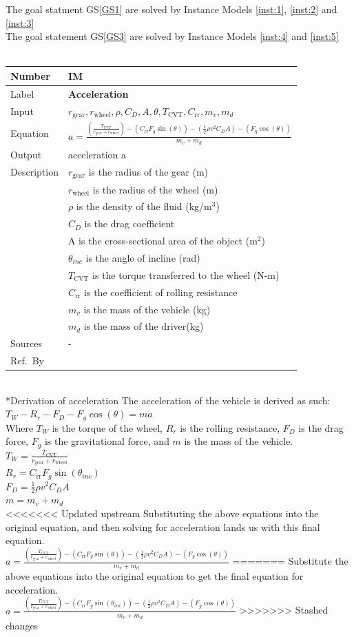 \documentclass[12pt]{article}
\newcommand{\colAwidth}{0.13\textwidth}
\newcommand{\colBwidth}{0.82\textwidth}
\newcounter{instnum} %
\newcommand{\definstance}[7] {
~\newline
\noindent
\begin{minipage}{\textwidth}
\renewcommand*{\arraystretch}{1.5}
\begin{tabular}{| p{\colAwidth} | p{\colBwidth}|}
  \hline
  \rowcolor[gray]{0.9}
  Number& IM\refstepcounter{instnum}\theinstnum \label{inst:\theinstnum}\\
  \hline
  Label& \bf #1 \\
  \hline
  Input& #2\\
  \hline
  Equation& #3\\
  \hline
  Output& #4\\
  \hline
  Description& #5 \\
  \hline
  Sources& #6 \\
  \hline
  Ref.\ By & #7\\
  \hline
\end{tabular}
\end{minipage}\\
}
\begin{document}
{\noindent}The goal statment GS\ref{GS1} are solved by Instance Models \ref{inst:1}, \ref{inst:2} and \ref{inst:3}\\
The goal statement GS\ref{GS3} are solved by Instance Models \ref{inst:4} and \ref{inst:5}\\
  \definstance
  {Acceleration}
  {$r_{\text{gear}}, r_{\text{wheel}}, \rho, C_D, A, \theta, T_{\text{CVT}}, C_{\text{rr}}, m_v, m_d$}
  {$a = \frac{\left( \frac{T_{\text{CVT}}}{r_{\text{gear}} + r_{\text{wheel}}} \right) - (C_{\text{rr}} F_g \sin(\theta)) - \left( \frac{1}{2} \rho v^2 C_D A \right) - (F_g \cos(\theta))}{m_v + m_d}$}
  {acceleration a}
  {$r_{\text{gear}}$ is the radius of the gear (m)\\
  & $r_{\text{wheel}}$ is the radius of the wheel (m)\\
  & $\rho$ is the density of the fluid (kg/m$^3$)\\
  & $C_D$ is the drag coefficient\\
  & A is the cross-sectional area of the object (m$^2$)\\
  & $\theta_{inc}$ is the angle of incline (rad)\\
  & $T_{\text{CVT}}$ is the torque transferred to the wheel (N-m)\\
  & $C_{\text{rr}}$ is the coefficient of rolling resistance\\
  & $m_v$ is the mass of the vehicle (kg)\\
  & $m_d$ is the mass of the driver(kg)}
  {-}
  
  
  \subsubsection*{Derivation of acceleration}
  The acceleration of the vehicle is derived as such: \\
  $T_W - R_r - F_D - F_g \cos(\theta) = ma$\\
  Where $T_W$ is the torque of the wheel, $R_r$ is the rolling resistance, $F_D$ is the drag force, $F_g$ is the gravitational force, and $m$ is the mass of the vehicle.\\
  $T_W = \frac{T_{\text{CVT}}}{r_{\text{gear}} + r_{\text{wheel}}}$\\
  $R_r = C_{\text{rr}} F_g \sin(\theta_{inc})$\\
  $F_D = \frac{1}{2} \rho v^2 C_D A$\\
  $m = m_v + m_d$\\
<<<<<<< Updated upstream
  Substituting the above equations into the original equation, and then solving for acceleration lands us with this final equation.\\
  $a = \frac{\left( \frac{T_{\text{CVT}}}{r_{\text{gear}} + r_{\text{wheel}}} \right) - (C_{\text{rr}} F_g \sin(\theta)) - \left( \frac{1}{2} \rho v^2 C_D A \right) - (F_g \cos(\theta))}{m_v + m_d}$
=======
  Substitute the above equations into the original equation to get the final equation for acceleration.\\
  $a = \frac{\left( \frac{T_{\text{CVT}}}{r_{\text{gear}} + r_{\text{wheel}}} \right) - (C_{\text{rr}} F_g \sin(\theta_{inc})) - \left( \frac{1}{2} \rho v^2 C_D A \right) - (F_g \cos(\theta))}{m_v + m_d}$
>>>>>>> Stashed changes
\end{document}
